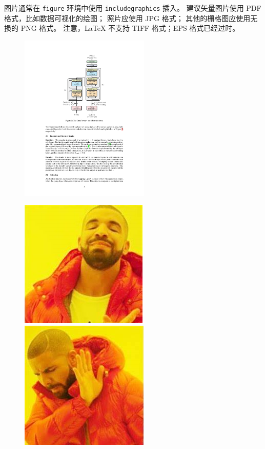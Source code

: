 \label{chap:3}


图片通常在 \texttt{figure} 环境中使用 \texttt{includegraphics} 插入。
建议矢量图片使用 PDF 格式，比如数据可视化的绘图；
照片应使用 JPG 格式；
其他的栅格图应使用无损的 PNG 格式。
注意，LaTeX 不支持 TIFF 格式；EPS 格式已经过时。

\begin{figure}[htbp]
\centering
\includegraphics[width=0.55\textwidth]{figures/transformer.pdf}
\label{fig:transformer}
\end{figure}

\begin{figure}[!t]
\centering
{}
    {\includegraphics[width=0.25\linewidth]{figures/yes.jpg}}
    {\includegraphics[width=0.25\linewidth]{figures/no.jpg}}
\label{fig:meme}
\end{figure}

